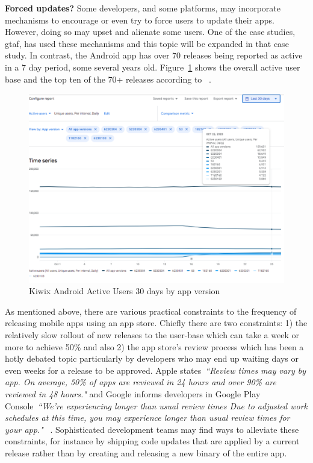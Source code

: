 \textbf{Forced updates?} Some developers, and some platforms, may incorporate mechanisms to encourage or even try to force users to update their apps. However, doing so may upset and alienate some users. One of the case studies, \Gls{gtaf}, has used these mechanisms and this topic will be expanded in that case study. In contrast, the  Android app has over 70 releases being reported as active in a 7 day period, some several years old. Figure~\ref{fig:kiwix-30d-active-users} shows the overall active user base and the top ten of the 70+ releases according to ~.

\begin{figure}
    \includegraphics[width=\linewidth]{images/android-vitals-screenshots/kiwix/kiwix-ActiveUsers-30-days-2020-10-29.pdf}
    \caption{Kiwix Android Active Users 30 days by app version}
    \label{fig:kiwix-30d-active-users}
\end{figure}

As mentioned above, there are various practical constraints to the frequency of releasing mobile apps using an app store. Chiefly there are two constraints: 1) the relatively slow rollout of new releases to the user-base which can take a week or more to achieve 50\% and also 2) the app store's review process which has been a hotly debated topic particularly by developers who may end up waiting days or even weeks for a release to be approved. Apple states~\emph{``Review times may vary by app. On average, 50\% of apps are reviewed in 24 hours and over 90\% are reviewed in 48 hours."} and Google informs developers in Google Play Console~\emph{``We're experiencing longer than usual review times
Due to adjusted work schedules at this time, you may experience longer than usual review times for your app."} ~. Sophisticated development teams may find ways to alleviate these constraints, for instance by shipping code updates that are applied by a current release rather than by creating and releasing a new binary of the entire app.


